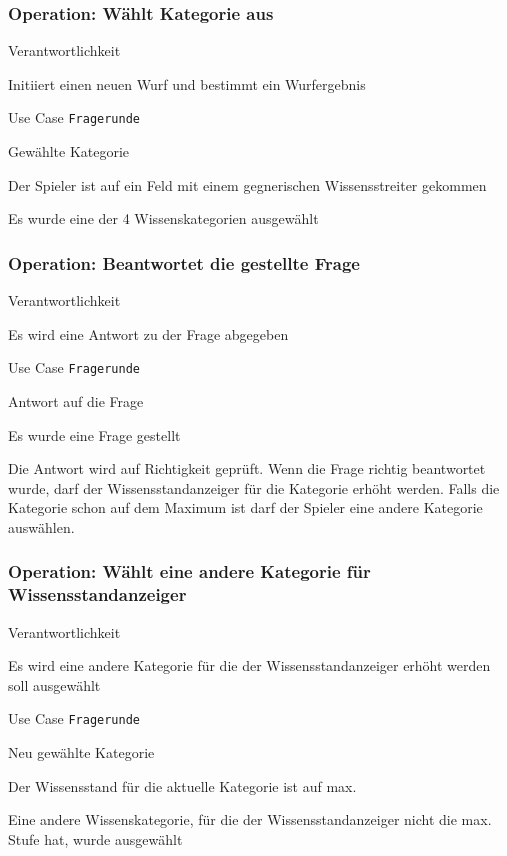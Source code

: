 \subsubsection{Operation: Wählt Kategorie aus}
\begin{labeling}[:]{Verantwortlichkeit}
\item [Verantwortlichkeit] Initiiert einen neuen Wurf und bestimmt ein Wurfergebnis
\item [Referenzen] Use Case \texttt{Fragerunde}
\item [Output] Gewählte Kategorie
\item [Vorbedingungen] Der Spieler ist auf ein Feld mit einem gegnerischen Wissensstreiter gekommen
\item [Nachbedingungen] Es wurde eine der 4 Wissenskategorien ausgewählt
\end{labeling}

\subsubsection{Operation: Beantwortet die gestellte Frage}
\begin{labeling}[:]{Verantwortlichkeit}
\item [Verantwortlichkeit] Es wird eine Antwort zu der Frage abgegeben
\item [Referenzen] Use Case \texttt{Fragerunde}
\item [Output] Antwort auf die Frage
\item [Vorbedingungen] Es wurde eine Frage gestellt
\item [Nachbedingungen] Die Antwort wird auf Richtigkeit geprüft. Wenn die Frage richtig beantwortet wurde, darf der Wissensstandanzeiger für die Kategorie erhöht werden. Falls die Kategorie schon auf dem Maximum ist darf der Spieler eine andere Kategorie auswählen.
\end{labeling}

\subsubsection{Operation: Wählt eine andere Kategorie für Wissensstandanzeiger}
\begin{labeling}[:]{Verantwortlichkeit}
\item [Verantwortlichkeit] Es wird eine andere Kategorie für die der Wissensstandanzeiger erhöht werden soll ausgewählt
\item [Referenzen] Use Case \texttt{Fragerunde}
\item [Output] Neu gewählte Kategorie
\item [Vorbedingungen] Der Wissensstand für die aktuelle Kategorie ist auf max.
\item [Nachbedingungen] Eine andere Wissenskategorie, für die der Wissensstandanzeiger nicht die max. Stufe hat, wurde ausgewählt
\end{labeling}

